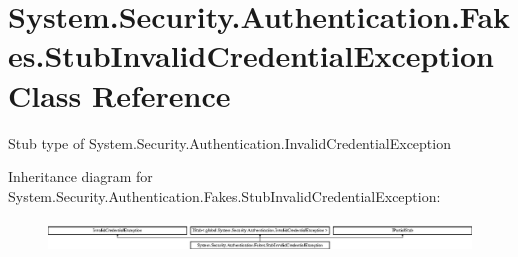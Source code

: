 \hypertarget{class_system_1_1_security_1_1_authentication_1_1_fakes_1_1_stub_invalid_credential_exception}{\section{System.\-Security.\-Authentication.\-Fakes.\-Stub\-Invalid\-Credential\-Exception Class Reference}
\label{class_system_1_1_security_1_1_authentication_1_1_fakes_1_1_stub_invalid_credential_exception}
}


Stub type of System.\-Security.\-Authentication.\-Invalid\-Credential\-Exception 


Inheritance diagram for System.\-Security.\-Authentication.\-Fakes.\-Stub\-Invalid\-Credential\-Exception\-:\begin{figure}[H]
\begin{center}
\leavevmode
\includegraphics[height=0.850418cm]{class_system_1_1_security_1_1_authentication_1_1_fakes_1_1_stub_invalid_credential_exception}
\end{center}
\end{figure}

